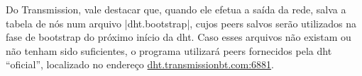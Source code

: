 Do Transmission, vale destacar que, quando ele efetua a saída da rede, salva a tabela
de nós num arquivo \sverb|dht.bootstrap|, cujos \glspl*{peer} salvos serão utilizados na
fase de \gls*{bootstrap} do próximo início da \gls*{dht}. Caso esses arquivos não
existam ou não tenham sido suficientes, o programa utilizará \glspl*{peer} fornecidos
pela \gls*{dht} ``oficial'', localizado no endereço \url{dht.transmissionbt.com:6881}.